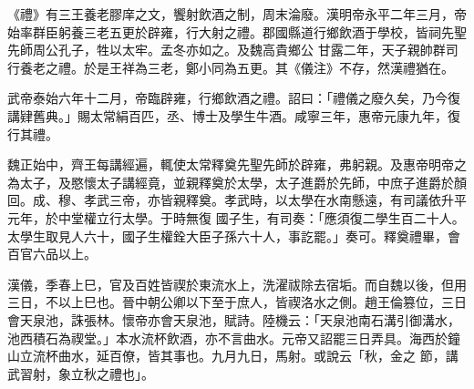 \begin{pinyinscope}
 《禮》有三王養老膠庠之文，饗射飲酒之制，周末淪廢。漢明帝永平二年三月，帝始率群臣躬養三老五更於辟雍，行大射之禮。郡國縣道行鄉飲酒于學校，皆祠先聖先師周公孔子，牲以太牢。孟冬亦如之。及魏高貴鄉公
 甘露二年，天子親帥群司行養老之禮。於是王祥為三老，鄭小同為五更。其《儀注》不存，然漢禮猶在。



 武帝泰始六年十二月，帝臨辟雍，行鄉飲酒之禮。詔曰：「禮儀之廢久矣，乃今復講肄舊典。」賜太常絹百匹，丞、博士及學生牛酒。咸寧三年，惠帝元康九年，復行其禮。



 魏正始中，齊王每講經遍，輒使太常釋奠先聖先師於辟雍，弗躬親。及惠帝明帝之為太子，及愍懷太子講經竟，並親釋奠於太學，太子進爵於先師，中庶子進爵於顏回。成、穆、孝武三帝，亦皆親釋奠。孝武時，以太學在水南懸遠，有司議依升平元年，於中堂權立行太學。于時無復
 國子生，有司奏：「應須復二學生百二十人。太學生取見人六十，國子生權銓大臣子孫六十人，事訖罷。」奏可。釋奠禮畢，會百官六品以上。



 漢儀，季春上巳，官及百姓皆禊於東流水上，洗濯祓除去宿垢。而自魏以後，但用三日，不以上巳也。晉中朝公卿以下至于庶人，皆禊洛水之側。趙王倫篡位，三日會天泉池，誅張林。懷帝亦會天泉池，賦詩。陸機云：「天泉池南石溝引御溝水，池西積石為禊堂。」本水流杯飲酒，亦不言曲水。元帝又詔罷三日弄具。海西於鐘山立流杯曲水，延百僚，皆其事也。九月九日，馬射。或說云「秋，金之
 節，講武習射，象立秋之禮也」。



\end{pinyinscope}